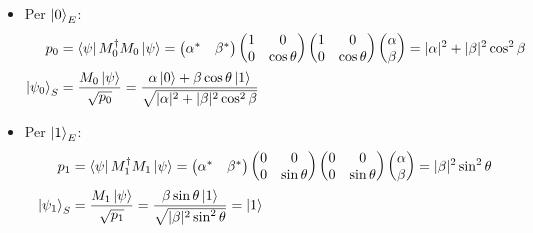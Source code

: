\documentclass[../../InformazioneQuantistica.tex]{subfiles}
\begin{document}
\begin{itemize}
\item Per $\Ket{0}_E$:
\begin{align*}
p_0 &= \Bra{\psi}M_0^\dag M_0 \Ket{\psi} = \begin{pmatrix}\alpha^* & \beta^*\end{pmatrix} \begin{pmatrix} 1 & 0 \\ 0 & \cos\theta \end{pmatrix} \begin{pmatrix} 1 & 0 \\ 0 & \cos\theta \end{pmatrix} \begin{pmatrix} \alpha \\ \beta \end{pmatrix} =|\alpha|^2 +|\beta|^2 \cos^2\beta\\
\Ket{\psi_0}_S&= \frac{M_0\Ket{\psi}}{\sqrt{p_0}} = \frac{\alpha\Ket{0}+ \beta \cos\theta \Ket{1}}{\sqrt{|\alpha|^2 + |\beta|^2 \cos^2\beta}}
\end{align*}
\item Per $\Ket{1}_E$:
\begin{align*}
p_1 &= \Bra{\psi}M_1^\dag M_1 \Ket{\psi} =  \begin{pmatrix}\alpha^* & \beta^*\end{pmatrix} \begin{pmatrix} 0 & 0 \\ 0 & \sin\theta \end{pmatrix} \begin{pmatrix} 0 & 0 \\ 0 & \sin\theta \end{pmatrix} \begin{pmatrix} \alpha \\ \beta \end{pmatrix} = |\beta|^2 \sin^2\theta\\
\Ket{\psi_1}_S &= \frac{M_1 \Ket{\psi}}{\sqrt{p_1}} = \frac{\beta \sin\theta \Ket{1}}{\sqrt{|\beta|^2\sin^2\theta}} =\Ket{1}
\end{align*}

\end{itemize}
\end{document}
